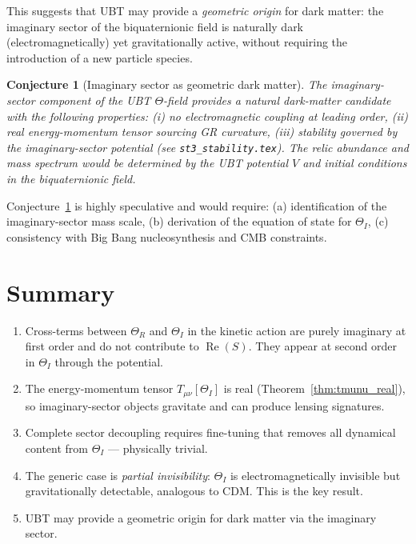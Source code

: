 \documentclass[12pt]{article}
\newtheorem{conjecture}{Conjecture}
\begin{document}
This suggests that UBT may provide a \emph{geometric origin} for
dark matter: the imaginary sector of the biquaternionic field is
naturally dark (electromagnetically) yet gravitationally active,
without requiring the introduction of a new particle species.

\begin{conjecture}[Imaginary sector as geometric dark matter]
\label{conj:dark_matter}
The imaginary-sector component of the UBT $\Theta$-field provides a
natural dark-matter candidate with the following properties:
(i) no electromagnetic coupling at leading order,
(ii) real energy-momentum tensor sourcing GR curvature,
(iii) stability governed by the imaginary-sector potential
     (see \texttt{st3\_stability.tex}).
The relic abundance and mass spectrum would be determined by the
UBT potential $V$ and initial conditions in the biquaternionic field.
\end{conjecture}

Conjecture~\ref{conj:dark_matter} is highly speculative and would
require: (a) identification of the imaginary-sector mass scale,
(b) derivation of the equation of state for $\Theta_I$,
(c) consistency with Big Bang nucleosynthesis and CMB constraints.

\section{Summary}
\begin{enumerate}
  \item Cross-terms between $\Theta_R$ and $\Theta_I$ in the kinetic
    action are purely imaginary at first order and do not contribute
    to $\operatorname{Re}(S)$.  They appear at second order in $\Theta_I$
    through the potential.
  \item The energy-momentum tensor $T_{\mu\nu}[\Theta_I]$ is real
    (Theorem~\ref{thm:tmunu_real}), so imaginary-sector objects
    gravitate and can produce lensing signatures.
  \item Complete sector decoupling requires fine-tuning that removes
    all dynamical content from $\Theta_I$ — physically trivial.
  \item The generic case is \emph{partial invisibility}:
    $\Theta_I$ is electromagnetically invisible but gravitationally
    detectable, analogous to CDM.  This is the key result.
  \item UBT may provide a geometric origin for dark matter via the
    imaginary sector.
\end{enumerate}
\end{document}

